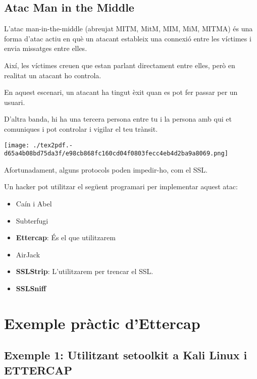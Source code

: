 \documentclass[]{article}
\begin{document}
\hypertarget{atac-man-in-the-middle}{%
\subsection{\texorpdfstring{\textbf{Atac Man in the
Middle}}{Atac Man in the Middle}}\label{atac-man-in-the-middle}}

L'atac man-in-the-middle (abreujat MITM, MitM, MIM, MiM, MITMA) és una
forma d'atac actiu en què un atacant estableix una connexió entre les
víctimes i envia missatges entre elles.

Així, les víctimes creuen que estan parlant directament entre elles,
però en realitat un atacant ho controla.

En aquest escenari, un atacant ha tingut èxit quan es pot fer passar per
un usuari.

D'altra banda, hi ha una tercera persona entre tu i la persona amb qui
et comuniques i pot controlar i vigilar el teu trànsit.

\texttt{[image: ./tex2pdf.-d65a4b08bd75da3f/e98cb868fc160cd04f0803fecc4eb4d2ba9a8069.png]}

Afortunadament, alguns protocols poden impedir-ho, com el SSL.

Un hacker pot utilitzar el següent programari per implementar aquest
atac:

\begin{itemize}
\item
  Caín i Abel
\item
  Subterfugi
\item
  \textbf{Ettercap}: És el que utilitzarem
\item
  AirJack
\item
  \textbf{SSLStrip}: L'utilitzarem per trencar el SSL.
\item
  \textbf{SSLSniff}
\end{itemize}

\hypertarget{exemple-pruxe0ctic-dettercap}{%
\section{\texorpdfstring{\textbf{Exemple pràctic
d'Ettercap}}{Exemple pràctic d'Ettercap}}\label{exemple-pruxe0ctic-dettercap}}

\hypertarget{exemple-1-utilitzant-setoolkit-a-kali-linux-i-ettercap}{%
\subsection{\texorpdfstring{\textbf{Exemple 1: Utilitzant
\textbf{setoolkit} a Kali Linux i
ETTERCAP}}{Exemple 1: Utilitzant setoolkit a Kali Linux i ETTERCAP}}\label{exemple-1-utilitzant-setoolkit-a-kali-linux-i-ettercap}}
\end{document}
